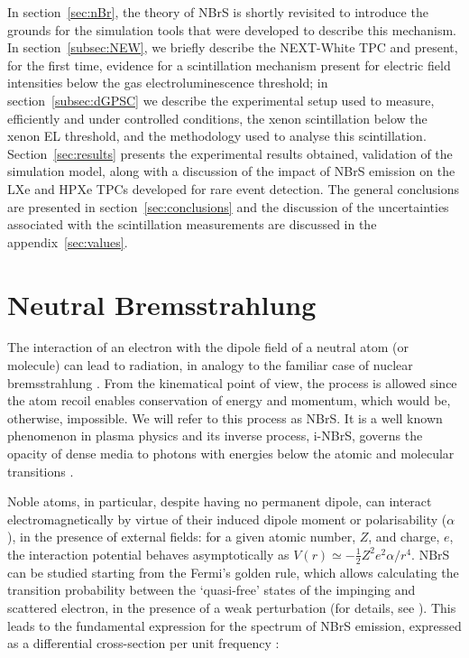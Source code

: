 \documentclass[%
 reprint,
superscriptaddress,
 amsmath,amssymb,
 aps,
]{revtex4-2}
\begin{document}
In section~\ref{sec:nBr}, the theory of NBrS is shortly revisited to introduce the grounds for the simulation tools that were developed to describe this mechanism. In section~\ref{subsec:NEW}, we briefly describe the NEXT-White TPC and present, for the first time, evidence for a scintillation mechanism present for electric field intensities below the gas electroluminescence threshold; in section~\ref{subsec:dGPSC} we describe the experimental setup used to measure, efficiently and under controlled conditions, the xenon scintillation below the xenon EL threshold, and the methodology used to analyse this scintillation. Section~\ref{sec:results} presents the experimental results obtained, validation of the simulation model, along with a discussion of the impact of NBrS emission on the LXe and HPXe TPCs developed for rare event detection. The general conclusions are presented in section~\ref{sec:conclusions} and the discussion of the uncertainties associated with the scintillation measurements are discussed in the appendix~\ref{sec:values}.


\section{\label{sec:nBr}Neutral Bremsstrahlung}

The interaction of an electron with the dipole field of a neutral atom (or molecule) can lead to radiation, in analogy to the familiar case of nuclear bremsstrahlung \cite{Geltman, Dalgarno, Ohmura, Johnston}. From the kinematical point of view, the process is allowed since the atom recoil enables conservation of energy and momentum, which would be, otherwise, impossible. We will refer to this process as NBrS. It is a well known phenomenon in plasma physics \cite{nBrPlasma} and its inverse process, i-NBrS, governs the opacity of dense media to photons with energies below the atomic and molecular transitions \cite{Geltman}.

Noble atoms, in particular, despite having no permanent dipole, can interact electromagnetically by virtue of their induced dipole moment or polarisability ($\alpha$), in the presence of external fields: for a given atomic number, $Z$, and charge, $e$, the interaction potential behaves asymptotically as $V(r) \simeq -\frac{1}{2} Z^2 e^2 \alpha /r^4$. NBrS can be studied starting from the Fermi's golden rule, which allows calculating the transition probability between the `quasi-free' states of the impinging and scattered electron, in the presence of a weak perturbation (for details, see \cite{Johnston}). This leads to the fundamental expression for the spectrum of NBrS emission, expressed as a differential cross-section per unit frequency \cite{Dalgarno}:
\end{document}
